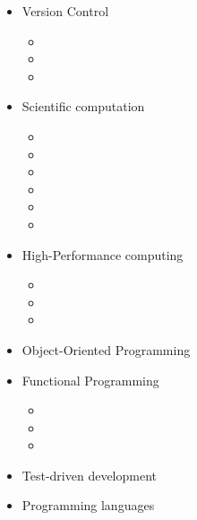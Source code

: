 \documentclass{CurriculumVitae}[10pt, draft, condensed]
\begin{document}
\begin{multicols}{4}
  
  \begin{itemize}[topsep=0pt]
    \setlength{\itemsep}{-0.3em}
  \item {\footnotesize Version Control}
    \begin{itemize}[topsep=0pt, partopsep=0pt]
      \setlength{\itemsep}{-0.3em}
    \item {}
    \item {}
    \item {}
    \end{itemize}
  \item {\footnotesize Scientific computation}
    \begin{itemize}[topsep=0pt, partopsep=0pt]
      \setlength{\itemsep}{-0.3em}
    \item {}
    \item {}
    \item {}
    \item {}
    \item {}
    \item {}
    \end{itemize}
  \item {\footnotesize High-Performance computing}
    \begin{itemize}[topsep=0pt, partopsep=0pt]
      \setlength{\itemsep}{-0.3em}
    \item {}
    \item {}
    \item {}
    \end{itemize}
  \item {\footnotesize Object-Oriented Programming}
  \item {\footnotesize Functional Programming}
    \begin{itemize}[topsep=0pt, partopsep=0pt]
      \setlength{\itemsep}{-0.3em}
    \item {}
    \item {}
    \item {}
    \end{itemize}
  \item {\footnotesize Test-driven development}
  \item {\footnotesize Programming languages}
    \begin{itemize}[topsep=0pt, partopsep=0pt]
      \setlength{\itemsep}{-0.3em}

\end{itemize}
\end{itemize}
\end{multicols}
\end{document}
